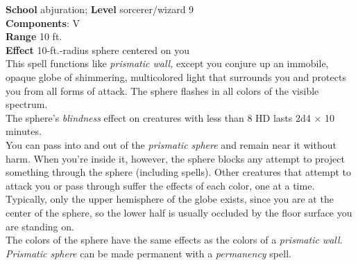 \textbf{School} abjuration; \textbf{Level} sorcerer/wizard 9\\
\textbf{Components}: V\\
\textbf{Range} 10 ft.\\
\textbf{Effect} 10-ft.-radius sphere centered on you\\
This spell functions like \textit{prismatic wall, }except you conjure up an immobile, opaque globe of shimmering, multicolored light that surrounds you and protects you from all forms of attack. The sphere flashes in all colors of the visible spectrum. \\
The sphere's \textit{blindness }effect on creatures with less than 8 HD lasts 2d4 × 10 minutes.\\
You can pass into and out of the \textit{prismatic sphere }and remain near it without harm. When you're inside it, however, the sphere blocks any attempt to project something through the sphere (including spells). Other creatures that attempt to attack you or pass through suffer the effects of each color, one at a time.\\
Typically, only the upper hemisphere of the globe exists, since you are at the center of the sphere, so the lower half is usually occluded by the floor surface you are standing on.\\
The colors of the sphere have the same effects as the colors of a \textit{prismatic wall.}\\
\textit{Prismatic sphere }can be made permanent with a \textit{permanency }spell.\\
